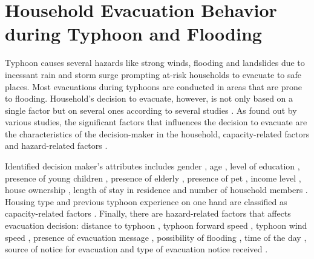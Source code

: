 \documentclass[runningheads]{llncs}
\begin{document}
\section{Household Evacuation Behavior during Typhoon and Flooding}
Typhoon causes several hazards like strong winds, flooding and landslides due to incessant rain and storm surge prompting at-risk households to evacuate to safe places. Most evacuations during typhoons are conducted in areas that are prone to flooding. Household’s decision to evacuate, however, is not only based on a single factor but on several ones according to several studies \cite{lim2016household, medina2016should, fu2004sequential, fu2006sequential, cahyanto2014empirical, stopher2004dynamic, fu2004sequential, whitehead2000heading}. As found out by various studies, the significant factors that influences the decision to evacuate are the characteristics of the decision-maker in the household, capacity-related factors and hazard-related factors \cite{lim2016household}. 

Identified decision maker’s attributes includes gender \cite{whitehead2000heading, cahyanto2014empirical, lim2016household}, age \cite{whitehead2000heading, cahyanto2014empirical, lim2016household}, level of education \cite{whitehead2000heading, hasan2010behavioral, lim2016household, medina2016should}, presence of young children \cite{whitehead2000heading, cahyanto2014empirical, lim2016household, medina2016should}, presence of elderly \cite{whitehead2000heading, cahyanto2014empirical}, presence of pet \cite{whitehead2000heading},  income level \cite{whitehead2000heading, cahyanto2014empirical, medina2016should}, house ownership \cite{lim2016household, hasan2010behavioral}, length of stay in residence \cite{lim2016household} and number of household members \cite{cahyanto2014empirical}. Housing type and previous typhoon experience on one hand are classified as capacity-related factors \cite{whitehead2000heading, fu2004sequential, fu2006sequential, hasan2010behavioral}. Finally, there are hazard-related factors that affects evacuation decision: distance to typhoon \cite{fu2004sequential, fu2006sequential}, typhoon forward speed \cite{fu2004sequential, fu2006sequential}, typhoon wind speed \cite{fu2006sequential}, presence of evacuation message \cite{fu2006sequential, hasan2010behavioral}, possibility of flooding \cite{fu2004sequential, fu2006sequential, hasan2010behavioral}, time of the day \cite{fu2004sequential, fu2006sequential}, source of notice for evacuation \cite{hasan2010behavioral} and type of evacuation notice received \cite{hasan2010behavioral}. 
\end{document}
